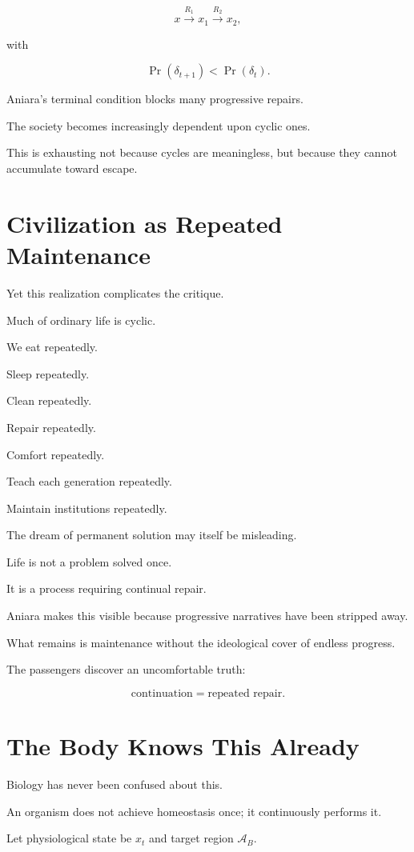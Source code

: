 \documentclass[11pt,oneside]{book}
\theoremstyle{definition}
\theoremstyle{remark}
\newcommand{\A}{\mathcal{A}}
\begin{document}
\[
x
\xrightarrow{R_1}
x_1
\xrightarrow{R_2}
x_2,
\]

with

\[
\Pr(\delta_{t+1})<\Pr(\delta_t).
\]

Aniara's terminal condition blocks many progressive repairs.

The society becomes increasingly dependent upon cyclic ones.

This is exhausting not because cycles are meaningless, but because they cannot accumulate toward escape.

\section{Civilization as Repeated Maintenance}

Yet this realization complicates the critique.

Much of ordinary life is cyclic.

We eat repeatedly.

Sleep repeatedly.

Clean repeatedly.

Repair repeatedly.

Comfort repeatedly.

Teach each generation repeatedly.

Maintain institutions repeatedly.

The dream of permanent solution may itself be misleading.

Life is not a problem solved once.

It is a process requiring continual repair.

Aniara makes this visible because progressive narratives have been stripped away.

What remains is maintenance without the ideological cover of endless progress.

The passengers discover an uncomfortable truth:

\[
\text{continuation}
=
\text{repeated repair}.
\]

\section{The Body Knows This Already}

Biology has never been confused about this.

An organism does not achieve homeostasis once; it continuously performs it.

Let physiological state be \(x_t\) and target region \(\A_B\).
\end{document}
